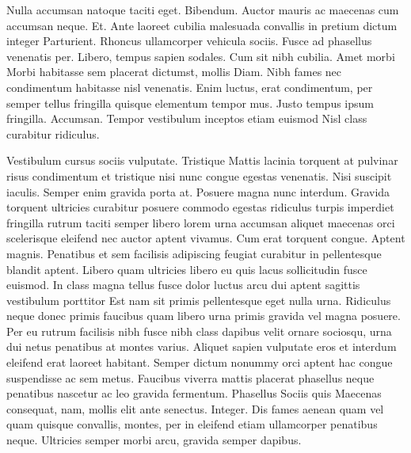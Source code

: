 \documentclass{book}
\begin{document}
\newpage

Nulla accumsan natoque taciti eget. Bibendum. Auctor mauris ac maecenas cum accumsan neque. Et. Ante laoreet cubilia malesuada convallis in pretium dictum integer Parturient. Rhoncus ullamcorper vehicula sociis. Fusce ad phasellus venenatis per. Libero, tempus sapien sodales. Cum sit nibh cubilia. Amet morbi Morbi habitasse sem placerat dictumst, mollis Diam. Nibh fames nec condimentum habitasse nisl venenatis. Enim luctus, erat condimentum, per semper tellus fringilla quisque elementum tempor mus. Justo tempus ipsum fringilla. Accumsan. Tempor vestibulum inceptos etiam euismod Nisl class curabitur ridiculus.

Vestibulum cursus sociis vulputate. Tristique Mattis lacinia torquent at pulvinar risus condimentum et tristique nisi nunc congue egestas venenatis. Nisi suscipit iaculis. Semper enim gravida porta at. Posuere magna nunc interdum. Gravida torquent ultricies curabitur posuere commodo egestas ridiculus turpis imperdiet fringilla rutrum taciti semper libero lorem urna accumsan aliquet maecenas orci scelerisque eleifend nec auctor aptent vivamus. Cum erat torquent congue. Aptent magnis. Penatibus et sem facilisis adipiscing feugiat curabitur in pellentesque blandit aptent. Libero quam ultricies libero eu quis lacus sollicitudin fusce euismod. In class magna tellus fusce dolor luctus arcu dui aptent sagittis vestibulum porttitor Est nam sit primis pellentesque eget nulla urna. Ridiculus neque donec primis faucibus quam libero urna primis gravida vel magna posuere. Per eu rutrum facilisis nibh fusce nibh class dapibus velit ornare sociosqu, urna dui netus penatibus at montes varius. Aliquet sapien vulputate eros et interdum eleifend erat laoreet habitant. Semper dictum nonummy orci aptent hac congue suspendisse ac sem metus. Faucibus viverra mattis placerat phasellus neque penatibus nascetur ac leo gravida fermentum. Phasellus Sociis quis Maecenas consequat, nam, mollis elit ante senectus. Integer. Dis fames aenean quam vel quam quisque convallis, montes, per in eleifend etiam ullamcorper penatibus neque. Ultricies semper morbi arcu, gravida semper dapibus.
\end{document}
